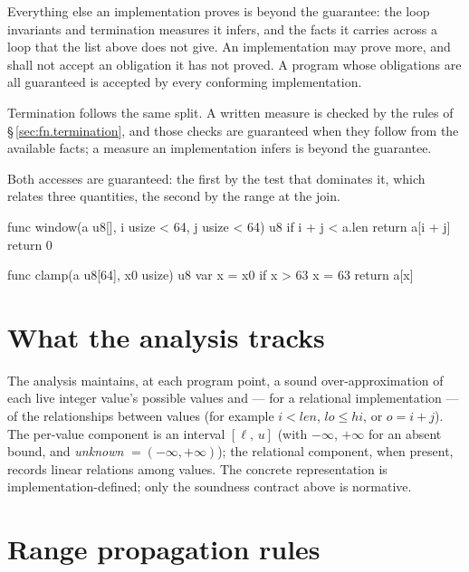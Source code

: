 \pnum
Everything else an implementation proves is beyond the guarantee: the loop
invariants and termination measures it infers, and the facts it carries across
a loop that the list above does not give.  An implementation may prove more,
and shall not accept an obligation it has not proved.  A program whose
obligations are all guaranteed is accepted by every conforming implementation.

\pnum
Termination follows the same split.  A written  measure is
checked by the rules of \S\,\ref{sec:fn.termination}, and those checks are
guaranteed when they follow from the available facts; a measure an
implementation infers is beyond the guarantee.

\begin{example}
Both accesses are guaranteed: the first by the test that dominates it, which
relates three quantities, the second by the range at the join.
\begin{laincode}
func window(a u8[], i usize < 64, j usize < 64) u8 {
    if i + j < a.len { return a[i + j] }
    return 0
}

func clamp(a u8[64], x0 usize) u8 {
    var x = x0
    if x > 63 { x = 63 }
    return a[x]
}
\end{laincode}
\end{example}

\section{What the analysis tracks}
\label{sec:vra.range}

\pnum
The analysis maintains, at each program point, a sound over-approximation of
each live integer value's possible values and --- for a relational
implementation --- of the relationships between values (for example
$i < \mathit{len}$, $\mathit{lo} \leq \mathit{hi}$, or $o = i + j$).  The
per-value component is an interval $[\ell,\, u]$ (with $-\infty$, $+\infty$ for
an absent bound, and \textit{unknown} $= (-\infty, +\infty)$); the relational
component, when present, records linear relations among values.  The concrete
representation is implementation-defined; only the soundness contract above is
normative.

\section{Range propagation rules}
\label{sec:vra.propagation}

